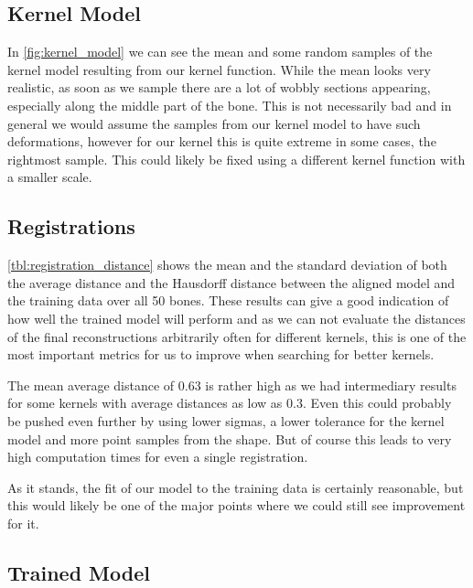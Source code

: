 \subsection{Kernel Model}
\label{subsec:kernmodeldisc}
In \autoref{fig:kernel_model} we can see the mean and some random samples of the kernel model resulting from our kernel function. While the mean looks very realistic, as soon as we sample there are a lot of wobbly sections appearing, especially along the middle part of the bone. This is not necessarily bad and in general we would assume the samples from our kernel model to have such deformations, however for our kernel this is quite extreme in some cases, \eg the rightmost sample. This could likely be fixed using a different kernel function with a smaller scale.


\subsection{Registrations}
\label{subsec:registrresultsdisc}
\autoref{tbl:registration_distance} shows the mean and the standard deviation of both the average distance and the Hausdorff distance between the aligned model and the training data over all 50 bones. These results can give a good indication of how well the trained model will perform and as we can not evaluate the distances of the final reconstructions arbitrarily often for different kernels, this is one of the most important metrics for us to improve when searching for better kernels.

The mean average distance of 0.63 is rather high as we had intermediary results for some kernels with average distances as low as 0.3. Even this could probably be pushed even further by using lower sigmas, a lower tolerance for the kernel model and more point samples from the shape. But of course this leads to very high computation times for even a single registration.

As it stands, the fit of our model to the training data is certainly reasonable, but this would likely be one of the major points where we could still see improvement for it.


\subsection{Trained Model}
\label{subsec:trainedmodeldisc}


